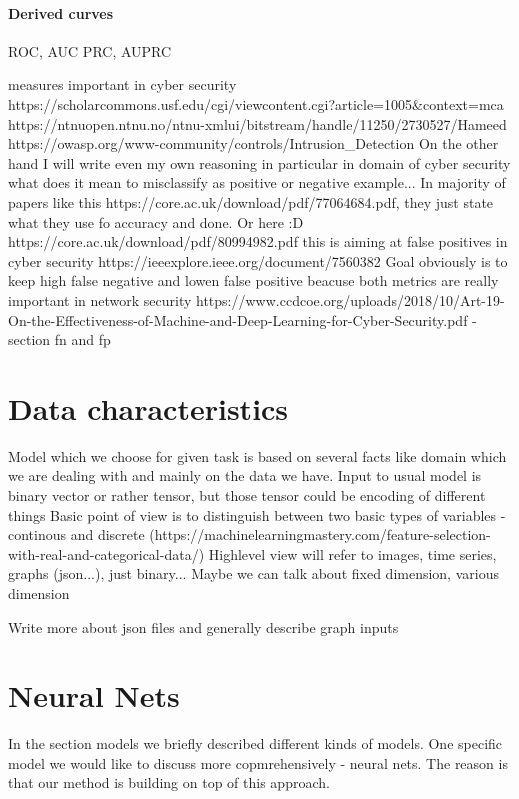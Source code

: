 \paragraph{Derived curves}
ROC, AUC \cite{Fawcett2006}
PRC, AUPRC \cite{Flach2015}

measures important in cyber security
https://scholarcommons.usf.edu/cgi/viewcontent.cgi?article=1005&context=mca
https://ntnuopen.ntnu.no/ntnu-xmlui/bitstream/handle/11250/2730527/Hameed%
https://owasp.org/www-community/controls/Intrusion_Detection
On the other hand I will write even my own reasoning in particular in domain of cyber security what does it mean to misclassify as positive or negative example...
In majority of papers like this https://core.ac.uk/download/pdf/77064684.pdf, they just state what they use fo accuracy and done. Or here :D https://core.ac.uk/download/pdf/80994982.pdf
this is aiming at false positives in cyber security https://ieeexplore.ieee.org/document/7560382
Goal obviously is to keep high false negative and lowen false positive beacuse both metrics are really important in network security
https://www.ccdcoe.org/uploads/2018/10/Art-19-On-the-Effectiveness-of-Machine-and-Deep-Learning-for-Cyber-Security.pdf - section fn and fp



\section{Data characteristics}
Model which we choose for given task is based on several facts like domain which we are dealing with and mainly on the data we have.
Input to usual model is binary vector or rather tensor, but those tensor could be encoding of different things
Basic point of view is to distinguish between two basic types of variables - continous and discrete (https://machinelearningmastery.com/feature-selection-with-real-and-categorical-data/)
Highlevel view will refer to images, time series, graphs (json...), just binary...
Maybe we can talk about fixed dimension, various dimension

Write more about json files and generally describe graph inputs

\section{Neural Nets}
In the section models  we briefly described different kinds of models. One specific model we would like to discuss more copmrehensively - neural nets. The reason is that our method is building on top of this approach.

